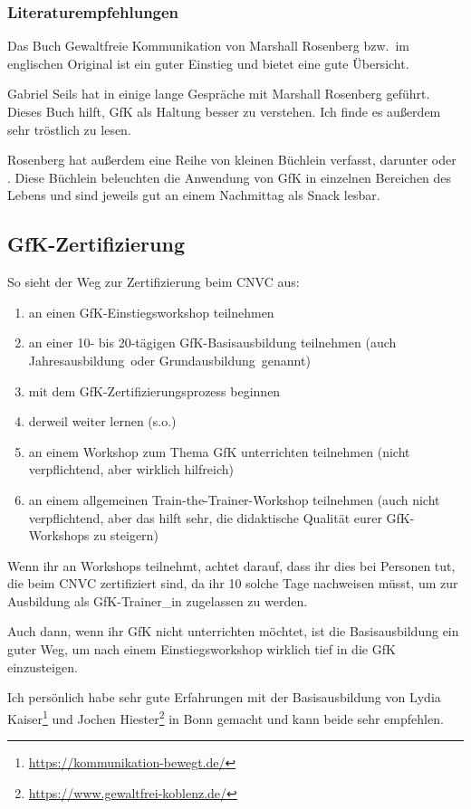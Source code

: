 \subsubsection{Literaturempfehlungen}

Das Buch \glqq Gewaltfreie Kommunikation\grqq{} von Marshall Rosenberg \cite{gfk-rosenberg} bzw.\ im englischen Original \cite{nvc-rosenberg} ist ein guter Einstieg und bietet eine gute Übersicht.

Gabriel Seils hat in \cite{gfk-gespraech} einige lange Gespräche mit Marshall Rosenberg geführt. Dieses Buch hilft, GfK als Haltung besser zu verstehen. Ich finde es außerdem sehr tröstlich zu lesen.

Rosenberg hat außerdem eine Reihe von kleinen Büchlein verfasst, darunter \cite{we-can-work-it-out} oder \cite{being-me-loving-you}. Diese Büchlein beleuchten die Anwendung von GfK in einzelnen Bereichen des Lebens und sind jeweils gut an einem Nachmittag als Snack lesbar.

\subsection{GfK-Zertifizierung}

So sieht der Weg zur Zertifizierung beim CNVC aus:

\begin{enumerate}
  \item an einen GfK-Einstiegsworkshop teilnehmen
  \item an einer 10- bis 20-tägigen GfK-Basisausbildung teilnehmen (auch \glqq Jahresausbildung\grqq\ oder \glqq Grundausbildung\grqq\ genannt)
  \item mit dem GfK-Zertifizierungsprozess\cite{gfk-trainer-werden} beginnen
  \item derweil weiter lernen (s.o.)
  \item an einem Workshop zum Thema \glqq GfK unterrichten\grqq{} teilnehmen (nicht verpflichtend, aber wirklich hilfreich)
  \item an einem allgemeinen Train-the-Trainer-Workshop teilnehmen (auch nicht verpflichtend, aber das hilft sehr, die didaktische Qualität eurer GfK-Workshops zu steigern)
\end{enumerate}

Wenn ihr an Workshops teilnehmt, achtet darauf, dass ihr dies bei Personen tut, die beim CNVC zertifiziert sind, da ihr 10 solche Tage nachweisen müsst, um zur Ausbildung als GfK-Trainer\_in zugelassen zu werden.

Auch dann, wenn ihr GfK nicht unterrichten möchtet, ist die Basisausbildung ein guter Weg, um nach einem Einstiegsworkshop wirklich tief in die GfK einzusteigen.

Ich persönlich habe sehr gute Erfahrungen mit der Basisausbildung von Lydia Kaiser\footnote{\url{https://kommunikation-bewegt.de/}} und Jochen Hiester\footnote{\url{https://www.gewaltfrei-koblenz.de/}} in Bonn gemacht und kann beide sehr empfehlen.

